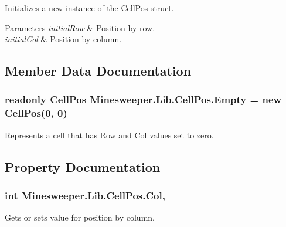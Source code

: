 Initializes a new instance of the \hyperlink{struct_minesweeper_1_1_lib_1_1_cell_pos}{Cell\+Pos} struct. 


\begin{DoxyParams}{Parameters}
{\em initial\+Row} & Position by row.\\
\hline
{\em initial\+Col} & Position by column.\\
\hline
\end{DoxyParams}


\subsection{Member Data Documentation}
\hypertarget{struct_minesweeper_1_1_lib_1_1_cell_pos_a27ef54d6b0afaaf63158d5b270be1afc}{
\subsubsection[{Empty}]{\setlength{\rightskip}{0pt plus 5cm}readonly {\bf Cell\+Pos} Minesweeper.\+Lib.\+Cell\+Pos.\+Empty = new {\bf Cell\+Pos}(0, 0)\hspace{0.3cm}{\ttfamily [static]}}}\label{struct_minesweeper_1_1_lib_1_1_cell_pos_a27ef54d6b0afaaf63158d5b270be1afc}


Represents a cell that has Row and Col values set to zero. 



\subsection{Property Documentation}
\hypertarget{struct_minesweeper_1_1_lib_1_1_cell_pos_a0188f8cda7f5c928a7c0e3f252878da2}{
\subsubsection[{Col}]{\setlength{\rightskip}{0pt plus 5cm}int Minesweeper.\+Lib.\+Cell\+Pos.\+Col\hspace{0.3cm}{\ttfamily [get]}, {\ttfamily [set]}}}\label{struct_minesweeper_1_1_lib_1_1_cell_pos_a0188f8cda7f5c928a7c0e3f252878da2}


Gets or sets value for position by column. 

